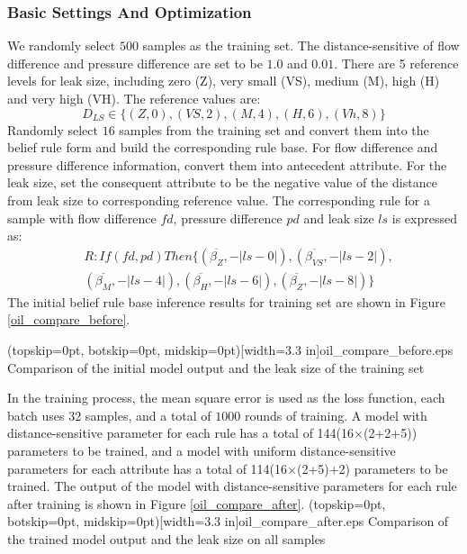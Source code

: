 \documentclass{ieeeaccess}
\begin{document}
\subsubsection{Basic Settings And Optimization}
We randomly select $500$ samples as the training set.
The distance-sensitive of flow difference and pressure difference are set to be $1.0$ and $0.01$.
There are 5 reference levels for leak size, including zero (Z), very small (VS), medium (M), high (H) and very high (VH).
The reference values are:
\begin{equation}
    D_{LS}\in \{(Z,0),(VS,2),(M,4),(H,6),(Vh,8)\}
\end{equation}
Randomly select $16$ samples from the training set and convert them into the belief rule form and build the corresponding rule base.
For flow difference and pressure difference information, convert them into antecedent attribute.
For the leak size, set the consequent attribute to be the negative value of the distance from leak size to corresponding reference value.
The corresponding rule for a sample with flow difference $fd$, pressure difference $pd$ and leak size $ls$ is expressed as:
\begin{equation}
    \begin{split}
        &R:If(fd,pd)Then\{(\overline{\beta_{Z}},-|ls-0|),(\overline{\beta_{VS}},-|ls-2|),\\
        &(\overline{\beta_{M}},-|ls-4|),(\overline{\beta_{H}},-|ls-6|),(\overline{\beta_{Z}},-|ls-8|)\}
    \end{split}
\end{equation}
The initial belief rule base inference results for training set are shown in Figure \ref{oil_compare_before}.

\Figure[!t](topskip=0pt, botskip=0pt, midskip=0pt)[width=3.3 in]{oil_compare_before.eps}
{Comparison of the initial model output and the leak size of the training set\label{oil_compare_before}}

In the training process, the mean square error is used as the loss function, each batch uses $32$ samples, and a total of $1000$ rounds of training.
A model with distance-sensitive parameter for each rule has a total of 144(16$\times$(2+2+5)) parameters to be trained,
and a model with uniform distance-sensitive parameters for each attribute has a total of 114(16$\times$(2+5)+2) parameters to be trained.
The output of the model with distance-sensitive parameters for each rule after training is shown in Figure \ref{oil_compare_after}.
\Figure[!t](topskip=0pt, botskip=0pt, midskip=0pt)[width=3.3 in]{oil_compare_after.eps}
{Comparison of the trained model output and the leak size on all samples\label{oil_compare_after}}
\end{document}
